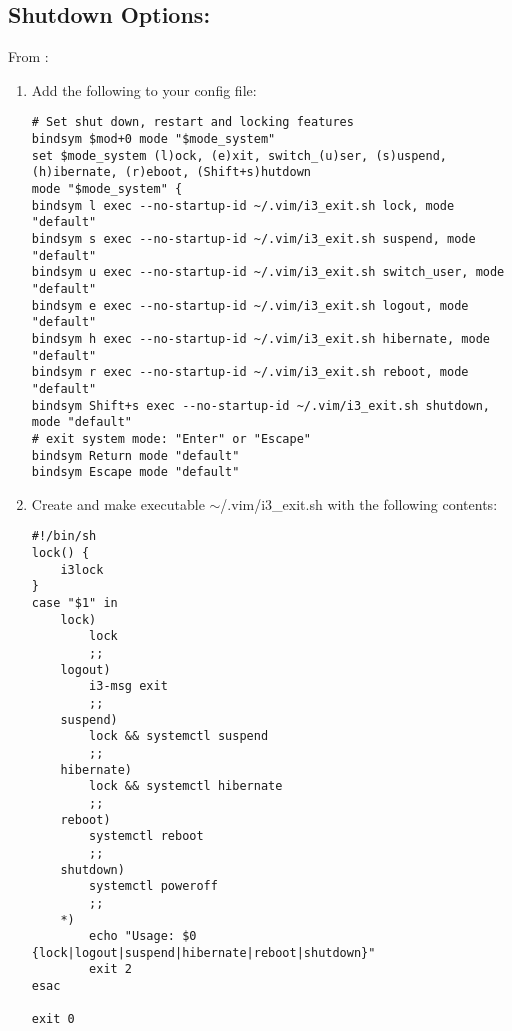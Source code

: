 \subsection{Shutdown Options:}
From \cite{jchamley2012how}:
\begin{enumerate}
    \item Add the following to your config file:
        \begin{lstlisting}
# Set shut down, restart and locking features
bindsym $mod+0 mode "$mode_system"
set $mode_system (l)ock, (e)xit, switch_(u)ser, (s)uspend, (h)ibernate, (r)eboot, (Shift+s)hutdown
mode "$mode_system" {
bindsym l exec --no-startup-id ~/.vim/i3_exit.sh lock, mode "default"
bindsym s exec --no-startup-id ~/.vim/i3_exit.sh suspend, mode "default"
bindsym u exec --no-startup-id ~/.vim/i3_exit.sh switch_user, mode "default"
bindsym e exec --no-startup-id ~/.vim/i3_exit.sh logout, mode "default"
bindsym h exec --no-startup-id ~/.vim/i3_exit.sh hibernate, mode "default"
bindsym r exec --no-startup-id ~/.vim/i3_exit.sh reboot, mode "default"
bindsym Shift+s exec --no-startup-id ~/.vim/i3_exit.sh shutdown, mode "default"
# exit system mode: "Enter" or "Escape"
bindsym Return mode "default"
bindsym Escape mode "default"
        \end{lstlisting}
    \item Create and make executable $\sim$/.vim/i3\_exit.sh with the following contents:
        \begin{lstlisting}
#!/bin/sh
lock() {
    i3lock
}
case "$1" in
    lock)
        lock
        ;;
    logout)
        i3-msg exit
        ;;
    suspend)
        lock && systemctl suspend
        ;;
    hibernate)
        lock && systemctl hibernate
        ;;
    reboot)
        systemctl reboot
        ;;
    shutdown)
        systemctl poweroff
        ;;
    *)
        echo "Usage: $0                                                      {lock|logout|suspend|hibernate|reboot|shutdown}"
        exit 2
esac

exit 0
        \end{lstlisting}
\end{enumerate}

